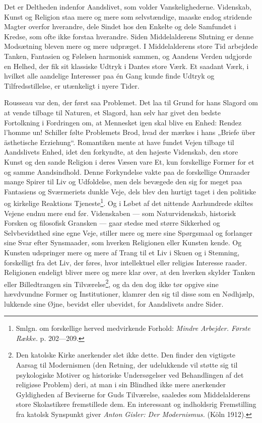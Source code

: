 \documentclass[12pt,a4paper,openany]{book}
\newcommand{\opage}[1]{\marginnote{\footnotesize\textit{[#1]}}}
\begin{document}
Det er Deltheden indenfor Aandslivet, som volder Vanskelighederne.
Videnskab, Kunst og Religion staa mere og mere
som selvstændige, maaske endog stridende Magter overfor hverandre,
dele Sindet hos den Enkelte og dele Samfundet i Kredse,
som ofte ikke forstaa hverandre. Siden Middelalderens Slutning
er denne Modsætning bleven mere og mere udpræget. I Middelalderens
store Tid arbejdede Tanken, Fantasien og Følelsen
harmonisk sammen, og Aandens Verden udgjorde en Helhed,
der fik sit klassiske Udtryk i Dantes store Værk. Et saadant
Værk, i hvilket alle aandelige Interesser paa én Gang kunde
finde Udtryk og Tilfredsstillelse, er utænkeligt i nyere Tider.

Rousseau var den, der først saa Problemet. Det laa til
Grund for hans Slagord om at vende tilbage til Naturen, et
Slagord, han selv har givet den bedste Fortolkning i Fordringen
om, at Mennesket igen skal blive en Enhed: Rendez l’homme
un! Schiller følte Problemets Brod, hvad der mærkes i hans
„Briefe über ästhetische Erziehung“. Romantiken mente at
have fundet Vejen tilbage til Aandslivets Enhed, idet den forkyndte,
at den højeste Videnskab, den store Kunst og den
sande Religion i deres Væsen vare Et, kun forskellige Former
for et og samme Aandsindhold. Denne Forkyndelse vakte paa
de forskellige Omraader mange Spirer til Liv og Udfoldelse,
men dels bevægede den sig for meget paa Fantasiens og Sværmeriets
dunkle Veje, dels blev den hurtigt taget i den politiske
og kirkelige Reaktions Tjeneste\footnote[1]{Smlgn. om forskellige herved medvirkende Forhold: \textit{Mindre Arbejder. Første Række.} p. 202---209.}. Og i Løbet af det nittende
Aarhundrede skiltes Vejene endnu mere end før. Videnskaben
--- som Naturvidenskab, historisk Forsken og filosofisk Gransken
--- gaar stedse med større Sikkerhed og Selvbevidsthed sine
egne Veje, stiller mere og mere sine Spørgsmaal og forlanger
sine Svar efter Synsmaader, som hverken Religionen eller
Kunsten kende. Og Kunsten udspringer mere og mere af
Trang til et Liv i Skuen og i Stemning, forskelligt fra det Liv,
\setcounter{footnote}{0}%
\opage{3}der føres, hvor intellektuel eller religiøs Interesse raader. Religionen
endeligt bliver mere og mere klar over, at den hverken
skylder Tanken eller Billedtrangen sin Tilværelse\footnote[1]{Den katolske Kirke anerkender slet ikke dette. Den finder den vigtigste Aarsag til Modernismen (den Retning, der udelukkende vil støtte sig til psykologiske Motiver og historiske Undersøgelser ved Behandlingen af det religiøse Problem) deri, at man i sin Blindhed ikke mere anerkender Gyldigheden af Beviserne for Guds Tilværelse, saaledes som Middelalderens store Skolastikere fremstillede dem. En interessant og indholdsrig Fremstilling fra katolsk Synspunkt giver \textit{Anton Gisler: Der Modernismus.} (Köln 1912).}, og da den
dog ikke tør opgive sine hævdvundne Former og Institutioner,
klamrer den sig til disse som en Nødhjælp, lukkende sine Øjne,
bevidst eller ubevidst, for Aandslivets andre Sider.
\end{document}
